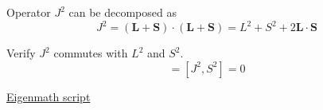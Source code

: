 Operator $J^2$ can be decomposed as
\begin{equation*}
J^2=(\mathbf L+\mathbf S)\cdot(\mathbf L+\mathbf S)=L^2+S^2+2\mathbf L\cdot\mathbf S
\tag{1}
\end{equation*}

Verify $J^2$ commutes with $L^2$ and $S^2$.
\begin{equation*}
[J^2,L^2]=[J^2,S^2]=0
\end{equation*}

\href{https://georgeweigt.github.io/examples/addition-of-angular-momentum-1-demo.html}{Eigenmath script}


